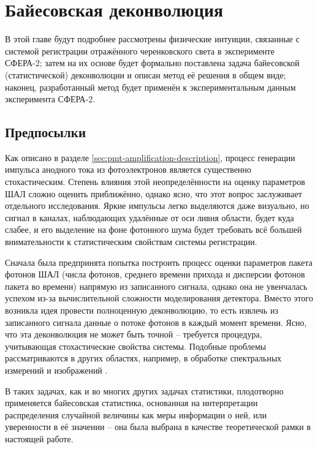 \chapter{Байесовская деконволюция}

\label{chapt:bayesian-deconvolution}

В этой главе будут подробнее рассмотрены физические интуиции, связанные с системой регистрации отражённого черенковского света в эксперименте СФЕРА-2; затем на их основе будет формально поставлена задача байесовской (статистической) деконволюции и описан метод её решения в общем виде; наконец, разработанный метод будет применён к экспериментальным данным эксперимента СФЕРА-2.

\section{Предпосылки}

Как описано в разделе \ref{sec:pmt-amplification-description}, процесс генерации импульса анодного тока из фотоэлектронов является существенно стохастическим. Степень влияния этой неопределённости на оценку параметров ШАЛ сложно оценить приближённо, однако ясно, что этот вопрос заслуживает отдельного исследования. Яркие импульсы легко выделяются даже визуально, но сигнал в каналах, наблюдающих удалённые от оси ливня области, будет куда слабее, и его выделение на фоне фотонного шума будет требовать всё большей внимательности к статистическим свойствам системы регистрации.

Сначала была предпринята попытка построить процесс оценки параметров пакета фотонов ШАЛ (числа фотонов, среднего времени прихода и дисперсии фотонов пакета во времени) напрямую из записанного сигнала, однако она не увенчалась успехом из-за вычислительной сложности моделирования детектора. Вместо этого возникла идея провести полноценную деконволюцию, то есть извлечь из записанного сигнала данные о потоке фотонов в каждый момент времени. Ясно, что эта деконволюция не может быть точной -- требуется процедура, учитывающая стохастические свойства системы. Подобные проблемы рассматриваются в других областях, например, в обработке спектральных измерений \cite{Rhode1993} и изображений \cite{Wipf2013}.

В таких задачах, как и во многих других задачах статистики, плодотворно применяется байесовская статистика, основанная на интерпретации распределения случайной величины как меры информации о ней, или уверенности в её значении \cite{Gelman2013} -- она была выбрана в качестве теоретической рамки в настоящей работе.

